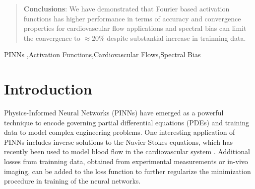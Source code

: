 \documentclass[times,twocolumn,final]{elsarticle}
\begin{document}
\begin{frontmatter}
\begin{abstract}
\textbf{Conclusions}: We have demonstrated that Fourier based activation functions has higher performance in terms of accuracy and convergence properties for cardiovascular flow applications and spectral bias can limit the convergence to $\approx 20\%$ despite substantial increase in trainning data.
\end{abstract}


\begin{keyword}
\KWD PINNs \sep Activation Functions\sep Cardiovascular Flows\sep Spectral Bias
\end{keyword}

\end{frontmatter}




\section{Introduction}
Physics-Informed Neural Networks (PINNs) have emerged as a powerful technique to encode governing partial differential equations (PDEs) and training data to model complex engineering problems. One interesting application of PINNs includes inverse solutions to the Navier-Stokes equations, which has recently been used to model blood flow in the cardiovascular system \citep{Arzani2021_PINNs, Moser2023_PINNs}. Additional losses from trainning data, obtained from experimental measurements or in-vivo imaging, can be added to the loss function to further regularize the minimization procedure in training of the neural networks. 
\end{document}
